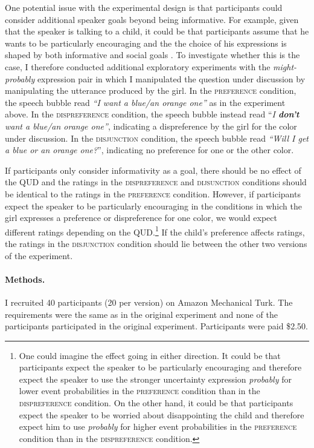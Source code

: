 One potential issue with the experimental design is that participants could consider additional speaker goals
beyond being informative. For example, given that the speaker is talking to a child, it could be that participants
assume that he wants to be particularly encouraging and the the choice of his expressions is shaped by both informative
and social goals \cite{Yoon2018}. To investigate whether this is the case, I therefore conducted additional exploratory experiments with
the \emph{might-probably} expression pair in which I manipulated the question under discussion \parencite[QUD;][]{Roberts2012} by manipulating 
the utterance produced by the girl. In the \textsc{preference} condition, the speech bubble read \emph{``I want a blue/an orange one''} as in the experiment
above. In the \textsc{dispreference} condition, the speech bubble instead read ``\emph{I \textbf{don't} want a blue/an orange one''}, indicating
a dispreference by the girl for the color under discussion. In the \textsc{disjunction} condition, the speech bubble read 
\emph{``Will I get a blue or an orange one?}'', indicating no preference for one or the other color. 

If participants only consider informativity as a goal, there should be no effect of the QUD and the ratings in the 
\textsc{dispreference} and \textsc{dijsunction} conditions should be identical to the ratings 
in the \textsc{preference} condition. However, if participants expect the speaker to be particularly encouraging in the 
conditions in which the girl expresses a preference or dispreference for one color, we would expect different
ratings depending on the QUD.\footnote{One could imagine the effect going in either direction. It could be that
participants expect the speaker to be particularly encouraging and therefore expect the speaker to use 
the stronger uncertainty expression \textit{probably} for lower event probabilities in the \textsc{preference} condition than 
in the \textsc{dispreference} condition. On the other hand, it could be that participants expect the speaker to be worried about 
disappointing the child and therefore expect him to use \textit{probably} for higher event probabilities in the \textsc{preference} 
condition than in the \textsc{dispreference} condition.} If the child's preference affects ratings, the ratings in the  
\textsc{disjunction} condition should lie between the other two versions of the experiment.

\paragraph{Methods.} I recruited 40 participants (20 per version) on Amazon Mechanical Turk. 
The requirements were the same as in the original experiment and none of the participants 
participated in the original experiment. Participants were paid  \$2.50.

